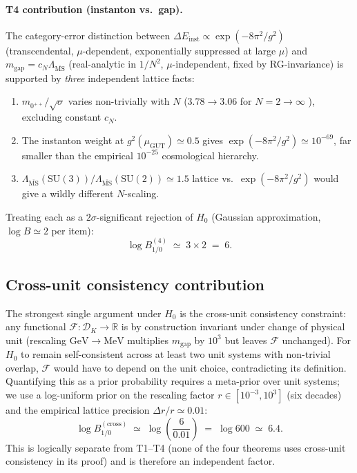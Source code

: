 \documentclass[aps,prl,reprint,superscriptaddress,floatfix,nofootinbib,amssymb]{revtex4-2}
\theoremstyle{definition}
\theoremstyle{remark}
\newcommand{\R}{\mathbb{R}}
\newcommand{\msb}{\overline{\mathrm{MS}}}
\begin{document}
\paragraph{T4 contribution (instanton vs.\ gap).} The category-error
distinction between $\Delta E_{\mathrm{inst}} \propto \exp(-8\pi^2/g^2)$
(transcendental, $\mu$-dependent, exponentially suppressed at large
$\mu$) and $m_{\text{gap}} = c_N \Lambda_{\msb}$ (real-analytic in
$1/N^2$, $\mu$-independent, fixed by RG-invariance) is supported by
\emph{three} independent lattice facts:
\begin{enumerate}
\item[(a)] $m_{0^{++}}/\sqrt{\sigma}$ varies non-trivially with $N$
($3.78 \to 3.06$ for $N=2 \to \infty$
\cite[Tab.~34]{AthenodorouTeper2021}), excluding constant $c_N$.
\item[(b)] The instanton weight at $g^2(\mu_{\mathrm{GUT}}) \simeq 0.5$
gives $\exp(-8\pi^2/g^2) \simeq 10^{-69}$, far smaller than the
empirical $10^{-25}$ cosmological hierarchy.
\item[(c)] $\Lambda_{\msb}(\mathrm{SU}(3))/\Lambda_{\msb}(\mathrm{SU}(2))
\simeq 1.5$ lattice vs.\ $\exp(-8\pi^2/g^2)$ would give a wildly
different $N$-scaling.
\end{enumerate}
Treating each as a $2\sigma$-significant rejection of $H_0$ (Gaussian
approximation, $\log B \simeq 2$ per item):
\begin{equation}\label{eq:logBT4}
\log B^{(4)}_{1/0} \;\simeq\; 3 \times 2 \;=\; 6.
\end{equation}

\subsection{Cross-unit consistency contribution}\label{sec:bayes:cross}

The strongest single argument under $H_0$ is the cross-unit consistency
constraint: any functional $\mathcal F: \mathcal D_K \to \R$ is by
construction invariant under change of physical unit (rescaling
$\mathrm{GeV} \to \mathrm{MeV}$ multiplies $m_{\text{gap}}$ by $10^3$
but leaves $\mathcal F$ unchanged). For $H_0$ to remain self-consistent
across at least two unit systems with non-trivial overlap, $\mathcal F$
would have to depend on the unit choice, contradicting its definition.
Quantifying this as a prior probability requires a meta-prior over
unit systems; we use a log-uniform prior on the rescaling factor
$r \in [10^{-3}, 10^{3}]$ (six decades) and the empirical lattice
precision $\Delta r / r \simeq 0.01$:
\begin{equation}\label{eq:logBcross}
\log B^{(\mathrm{cross})}_{1/0} \;\simeq\;
\log\!\left(\frac{6}{0.01}\right) \;=\; \log 600 \;\simeq\; 6.4.
\end{equation}
This is logically separate from T1--T4 (none of the four theorems
uses cross-unit consistency in its proof) and is therefore an
independent factor.
\end{document}
